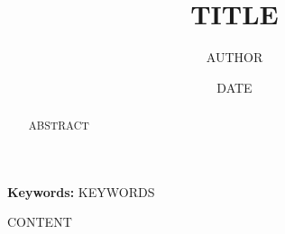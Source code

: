 \documentclass[11pt,a4paper]{report}
\title{{{TITLE}}}
\author{{{AUTHOR}}}
\date{{{DATE}}}
\begin{document}
\maketitle

\begin{abstract}
{{ABSTRACT}}
\end{abstract}

\noindent\textbf{Keywords:} {{KEYWORDS}}
\tableofcontents
\newpage

{{CONTENT}}



\end{document}
